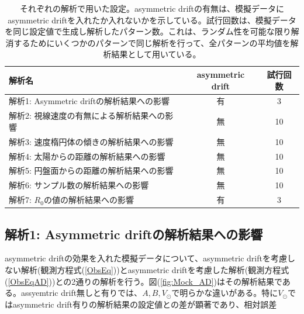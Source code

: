 \begin{table}
\begin{center}
\begin{tabular}{l|c|c} \hline
 \rowcolor{LightCyan}
 解析名 & asymmetric drift & 試行回数 \\
 \hline
 解析1: Asymmetric driftの解析結果への影響 & 有 & 3\\
 \hline
 解析2: 視線速度の有無による解析結果への影響 & 無 & 10\\
 \hline
 解析3: 速度楕円体の傾きの解析結果への影響 & 無 & 10\\
 \hline
 解析4: 太陽からの距離の解析結果への影響 & 無 & 10\\
 \hline
 解析5: 円盤面からの距離の解析結果への影響 & 無 & 10\\
 \hline
 解析6: サンプル数の解析結果への影響 & 無 & 10\\
 \hline
 解析7: $R_0$の値の解析結果への影響 & 有 & 3\\
 \hline
\end{tabular}
\vspace{3mm}
\caption{それぞれの解析で用いた設定。asymmetric driftの有無は、模擬データにasymmetric driftを入れたか入れないかを示している。試行回数は、模擬データを同じ設定値で生成し解析したパターン数。これは、ランダム性を可能な限り解消するためにいくつかのパターンで同じ解析を行って、全パターンの平均値を解析結果として用いている。}
\label{table5}
\end{center}
\end{table}


\subsection{解析1: Asymmetric driftの解析結果への影響}
asymmetric driftの効果を入れた模擬データについて、asymmetric driftを考慮しない解析(観測方程式(\ref{ObsEq}))とasymmetric driftを考慮した解析(観測方程式(\ref{ObsEqAD}))との2通りの解析を行う。図(\ref{fig:Mock_AD})はその解析結果である。assyemtric drift無しと有りでは、$A,B,V_{\odot}$で明らかな違いがある。特に$V_{\odot}$ではasymmetric drift有りの解析結果の設定値との差が顕著であり、相対誤差

